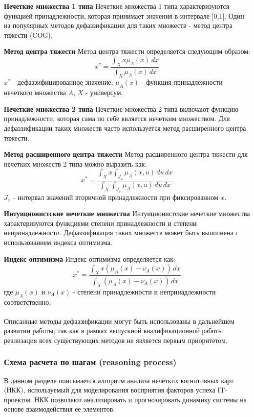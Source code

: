 \documentclass{article}
\begin{document}
    \textbf{Нечеткие множества 1 типа}
    Нечеткие множества 1 типа характеризуются функцией принадлежности, которая принимает значения в интервале [0,1]. Один из популярных методов дефаззификации для таких множеств - метод центра тяжести (COG).

    \textbf{Метод центра тяжести}
    Метод центра тяжести определяется следующим образом:
    \[
        x^* = \frac{\int_{X} x \mu_A(x) \, dx}{\int_{X} \mu_A(x) \, dx}
    \]
    $x^*$ - дефаззифицированное значение, $\mu_A(x)$ - функция принадлежности нечеткого множества $A$, $X$ - универсум.

    \textbf{Нечеткие множества 2 типа}
    Нечеткие множества 2 типа включают функцию принадлежности, которая сама по себе является нечетким множеством. Для дефаззификации таких множеств часто используется метод расширенного центра тяжести.

    \textbf{Метод расширенного центра тяжести}
    Метод расширенного центра тяжести для нечетких множеств 2 типа можно выразить как:
    \[
        x^* = \frac{\int_{X} x \int_{J_x} \mu_{A}(x, u) \, du \, dx}{\int_{X} \int_{J_x} \mu_{A}(x, u) \, du \, dx}
    \]
    $J_x$ - интервал значений вторичной принадлежности при фиксированном $x$.

    \textbf{Интуиционистские нечеткие множества}
    Интуиционистские нечеткие множества характеризуются функциями степени принадлежности и степени непринадлежности. Дефаззификация таких множеств может быть выполнена с использованием индекса оптимизма\cite{litlink23}.

    \textbf{Индекс оптимизма}
    Индекс оптимизма определяется как:
    \[
        x^* = \frac{\int_{X} x (\mu_A(x) - \nu_A(x)) \, dx}{\int_{X} (\mu_A(x) - \nu_A(x)) \, dx}
    \]
    где $\mu_A(x)$ и $\nu_A(x)$ - степени принадлежности и непринадлежности соответственно.\\
    ~\\
    Описанные методы дефаззификации могут быть использованы в дальнейшем развитии работы, так как в рамках выпускной квалификационной работы реализация всех существующих методов не является первым приоритетом.
    \subsubsection {Схема расчета по шагам (reasoning process)}
    В данном разделе описывается алгоритм анализа нечетких когнитивных карт (НКК), используемый для моделирования восприятия факторов успеха IT-проектов. НКК позволяют анализировать и прогнозировать динамику системы на основе взаимодействия ее элементов.
\end{document}
